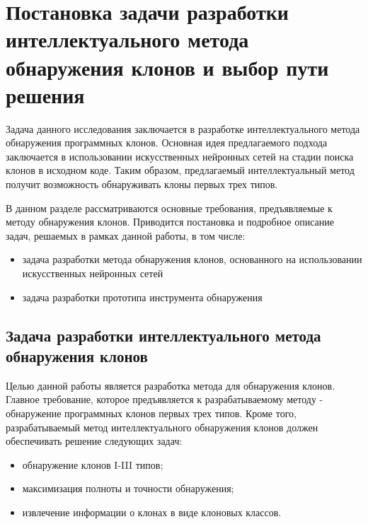 \chapter{Постановка задачи разработки интеллектуального метода обнаружения клонов и выбор пути решения}

Задача данного исследования заключается в разработке интеллектуального метода обнаружения программных клонов. Основная идея предлагаемого подхода заключается в использовании искусственных нейронных сетей на стадии поиска клонов в исходном коде. Таким образом, предлагаемый интеллектуальный метод получит возможность обнаруживать клоны первых трех типов.

В данном разделе рассматриваются основные требования, предъявляемые к методу обнаружения клонов. Приводится постановка и подробное описание задач, решаемых в рамках данной работы, в том числе:
\begin{itemize}
\setlength\itemsep{0mm}
\item задача разработки метода обнаружения клонов, основанного на использовании искусственных нейронных сетей
\item задача разработки прототипа инструмента обнаружения
\end{itemize}
\section{Задача разработки интеллектуального метода обнаружения клонов}

Целью данной работы является разработка метода для обнаружения клонов. Главное требование, которое предъявляется к разрабатываемому методу - обнаружение программных клонов первых трех типов. Кроме того, разрабатываемый метод интеллектуального обнаружения клонов должен обеспечивать решение следующих задач:
\begin{itemize}
\setlength\itemsep{0mm}
\item обнаружение клонов I-III типов;
\item максимизация полноты и точности обнаружения;
\item извлечение информации о клонах в виде клоновых классов.
\end{itemize}

